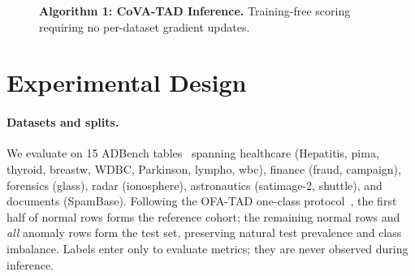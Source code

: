 \documentclass{article}
\begin{document}
\begin{figure}[t]
\begin{center}
\end{center}
\vspace{-6pt}
\caption{\textbf{Algorithm 1: CoVA-TAD Inference.} Training-free scoring requiring no per-dataset gradient updates.}
\label{alg:covatad}
\end{figure}

\section{Experimental Design}
\label{sec:experiments}

\paragraph{Datasets and splits.}
We evaluate on 15 ADBench tables~\citep{han2022adbench} spanning healthcare (Hepatitis, pima, thyroid, breastw, WDBC, Parkinson, lympho, wbc), finance (fraud, campaign), forensics (glass), radar (ionosphere), astronautics (satimage-2, shuttle), and documents (SpamBase). Following the OFA-TAD one-class protocol~\citep{li2026towards}, the first half of normal rows forms the reference cohort; the remaining normal rows and \emph{all} anomaly rows form the test set, preserving natural test prevalence and class imbalance. Labels enter only to evaluate metrics; they are never observed during inference.
\end{document}
